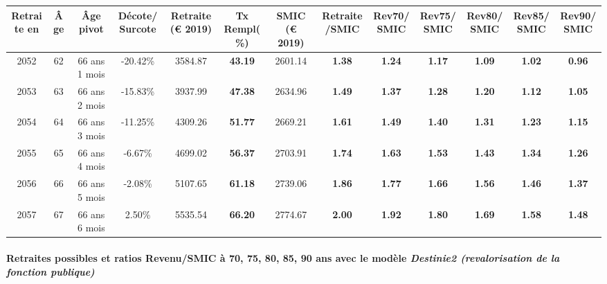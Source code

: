 { \scriptsize \begin{center} 
\begin{tabular}[htb]{|c|c||c|c||c|c||c||c|c|c|c|c|c|} 
\hline 
 Retraite en &  Âge &  Âge pivot &  Décote/Surcote &  Retraite (\euro{} 2019) &  Tx Rempl(\%) &  SMIC (\euro{} 2019) &  Retraite/SMIC &  Rev70/SMIC &  Rev75/SMIC &  Rev80/SMIC &  Rev85/SMIC &  Rev90/SMIC \\ 
\hline \hline 
 2052 &  62 &  66 ans 1 mois &  -20.42\% &  3584.87 &  {\bf 43.19} &  2601.14 &  {\bf 1.38} &  {\bf 1.24} &  {\bf 1.17} &  {\bf 1.09} &  {\bf 1.02} &  {\bf {\color{red} 0.96}} \\ 
\hline 
 2053 &  63 &  66 ans 2 mois &  -15.83\% &  3937.99 &  {\bf 47.38} &  2634.96 &  {\bf 1.49} &  {\bf 1.37} &  {\bf 1.28} &  {\bf 1.20} &  {\bf 1.12} &  {\bf 1.05} \\ 
\hline 
 2054 &  64 &  66 ans 3 mois &  -11.25\% &  4309.26 &  {\bf 51.77} &  2669.21 &  {\bf 1.61} &  {\bf 1.49} &  {\bf 1.40} &  {\bf 1.31} &  {\bf 1.23} &  {\bf 1.15} \\ 
\hline 
 2055 &  65 &  66 ans 4 mois &  -6.67\% &  4699.02 &  {\bf 56.37} &  2703.91 &  {\bf 1.74} &  {\bf 1.63} &  {\bf 1.53} &  {\bf 1.43} &  {\bf 1.34} &  {\bf 1.26} \\ 
\hline 
 2056 &  66 &  66 ans 5 mois &  -2.08\% &  5107.65 &  {\bf 61.18} &  2739.06 &  {\bf 1.86} &  {\bf 1.77} &  {\bf 1.66} &  {\bf 1.56} &  {\bf 1.46} &  {\bf 1.37} \\ 
\hline 
 2057 &  67 &  66 ans 6 mois &  2.50\% &  5535.54 &  {\bf 66.20} &  2774.67 &  {\bf 2.00} &  {\bf 1.92} &  {\bf 1.80} &  {\bf 1.69} &  {\bf 1.58} &  {\bf 1.48} \\ 
\hline 
\hline 
\end{tabular} 
\end{center} } 
\paragraph{Retraites possibles et ratios Revenu/SMIC à 70, 75, 80, 85, 90 ans avec le modèle \emph{Destinie2 (revalorisation de la fonction publique)}}  
 
